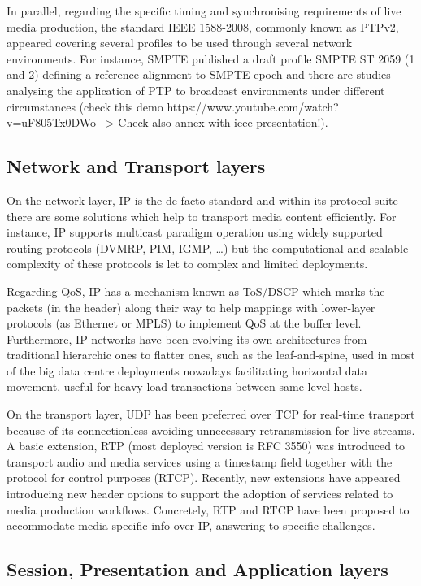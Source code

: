 In parallel, regarding the specific timing and synchronising requirements of live media production,
the standard IEEE 1588-2008, commonly known as PTPv2, appeared covering several profiles to be used through several network environments. For instance, SMPTE published a draft profile SMPTE ST 2059 (1 and 2) defining a reference alignment to SMPTE epoch and there are studies analysing the application of PTP to broadcast environments under different circumstances (check this demo https://www.youtube.com/watch?v=uF805Tx0DWo --> Check also annex with ieee presentation!).

\subsection{Network and Transport layers}

On the network layer, IP is the de facto standard and within its protocol suite there are some solutions which help to transport media content efficiently. For instance, IP supports multicast paradigm operation using widely supported routing protocols (DVMRP, PIM, IGMP, \ldots) but the
computational and scalable complexity of these protocols is let to complex and limited deployments.

Regarding QoS, IP has a mechanism known as ToS/DSCP which marks the packets (in the header)
along their way to help mappings with lower-layer protocols (as Ethernet or MPLS) to implement
QoS at the buffer level. Furthermore, IP networks have been evolving its own architectures from
traditional hierarchic ones to flatter ones, such as the leaf-and-spine, used in most of the big data centre deployments nowadays facilitating horizontal data movement, useful for heavy load
transactions between same level hosts.

On the transport layer, UDP has been preferred over TCP for real-time transport because of its
connectionless avoiding unnecessary retransmission for live streams. A basic extension, RTP (most
deployed version is RFC 3550) was introduced to transport audio and media services using a
timestamp field together with the protocol for control purposes (RTCP). Recently, new extensions
have appeared introducing new header options to support the adoption of services related to media
production workflows. Concretely, RTP and RTCP have been proposed to accommodate media specific info over IP, answering to specific challenges.

\subsection{Session, Presentation and Application layers}

